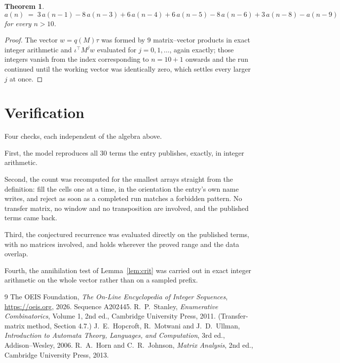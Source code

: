 \documentclass[11pt,a4paper]{article}
\theoremstyle{plain}
\newtheorem{theorem}{Theorem}
\theoremstyle{definition}
\begin{document}
\begin{theorem}
\[
a(n)\;=\;3\,a(n-1) - 8\,a(n-3) + 6\,a(n-4) + 6\,a(n-5) - 8\,a(n-6) + 3\,a(n-8) - a(n-9)
\]
for every $n>10$.
\end{theorem}

\begin{proof}
The vector $w=q(M)\tau$ was formed by $9$ matrix--vector products in exact integer
arithmetic and $\iota^{\!\top}M^{j}w$ evaluated for $j=0,1,\dots$, again exactly; those
integers vanish from the index corresponding to $n=10+1$ onwards and the run continued
until the working vector was identically zero, which settles every larger $j$ at once.
\end{proof}

\section{Verification}

Four checks, each independent of the algebra above.

First, the model reproduces all $30$ terms the entry publishes, exactly, in integer
arithmetic.

Second, the count was recomputed for the smallest arrays straight from the definition: fill the
cells one at a time, in the orientation the entry's own name writes, and reject as soon as a
completed run matches a forbidden pattern. No transfer matrix, no window and no transposition
are involved, and the published terms came back.

Third, the conjectured recurrence was evaluated directly on the published terms, with no
matrices involved, and holds wherever the proved range and the data overlap.

Fourth, the annihilation test of Lemma~\ref{lem:crit} was carried out in exact integer
arithmetic on the whole vector rather than on a sampled prefix.

\begin{thebibliography}{9}
 The OEIS Foundation, \emph{The On-Line Encyclopedia of Integer
Sequences}, \url{https://oeis.org}, 2026. Sequence A202445.
 R.~P.~Stanley, \emph{Enumerative Combinatorics}, Volume 1, 2nd ed.,
Cambridge University Press, 2011. (Transfer-matrix method, Section 4.7.)
 J.~E.~Hopcroft, R.~Motwani and J.~D.~Ullman, \emph{Introduction to Automata
Theory, Languages, and Computation}, 3rd ed., Addison--Wesley, 2006.
 R.~A.~Horn and C.~R.~Johnson, \emph{Matrix Analysis}, 2nd ed., Cambridge
University Press, 2013.
\end{thebibliography}
\end{document}
